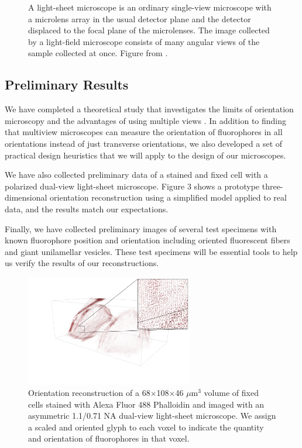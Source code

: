 \documentclass[11pt, draft]{article}
\begin{document}
\begin{figure}[t]
\begin{minipage}{.45\textwidth}
  \caption{A light-sheet microscope is an ordinary single-view microscope with a
    microlens array in the usual detector plane and the detector displaced to
    the focal plane of the microlenses. The image collected by a light-field
    microscope consists of many angular views of the sample collected at
    once. Figure from \cite{levoy2006}.}
  \label{fig:test2}
\end{minipage}
\end{figure}

\subsection*{Preliminary Results}
We have completed a theoretical study that investigates the limits of
orientation microscopy and the advantages of using multiple views
\cite{chandler17}. In addition to finding that multiview microscopes can measure
the orientation of fluorophores in all orientations instead of just transverse
orientations, we also developed a set of practical design heuristics that we
will apply to the design of our microscopes.

We have also collected preliminary data of a stained and fixed cell with a
polarized dual-view light-sheet microscope. Figure 3 shows a prototype
three-dimensional orientation reconstruction using a simplified model applied to
real data, and the results match our expectations.

Finally, we have collected preliminary images of several test specimens with
known fluorophore position and orientation including oriented fluorescent fibers
and giant unilamellar vesicles. These test specimens will be essential tools to
help us verify the results of our reconstructions.

\begin{figure}[t]
\centering
  \includegraphics[width=0.65\textwidth, interpolate=true, trim={6em 4em 2em 0em}]{figs/inset}
  \caption{Orientation reconstruction of a 68$\times$108$\times$46 $\mu$m${}^3$
    volume of fixed cells stained with Alexa Fluor 488 Phalloidin and imaged
    with an asymmetric 1.1/0.71 NA dual-view light-sheet microscope. We assign a
    scaled and oriented glyph to each voxel to indicate the quantity and
    orientation of fluorophores in that voxel.}
  \label{fig:test1}
\end{figure}
\end{document}
